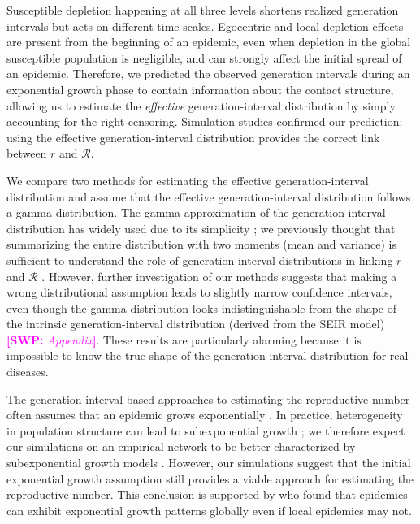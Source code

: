 \documentclass[12pt]{article}
\newcommand{\RR}{\ensuremath{{\mathcal R}}}
\newcommand{\comment}[3]{\textcolor{#1}{\textbf{[#2: }\textsl{#3}\textbf{]}}}
\newcommand{\swp}[1]{\comment{magenta}{SWP}{#1}}
\begin{document}
Susceptible depletion happening at all three levels shortens realized generation intervals but acts on different time scales.
Egocentric and local depletion effects are present from the beginning of an epidemic, even when depletion in the global susceptible population is negligible, and can strongly affect the initial spread of an epidemic.
Therefore, we predicted the observed generation intervals during an exponential growth phase to contain information about the contact structure, allowing us to estimate the \emph{effective} generation-interval distribution by simply accounting for the right-censoring.
Simulation studies confirmed our prediction: using the effective generation-interval distribution provides the correct link between $r$ and $\RR$.

We compare two methods for estimating the effective generation-interval distribution and assume that the effective generation-interval distribution follows a gamma distribution.
The gamma approximation of the generation interval distribution has widely used due to its simplicity \citep{mcbryde2009early, nishiura2009transmission, roberts2011early, trichereau2012estimation, nishiura2015theoretical};
we previously thought that summarizing the entire distribution with two moments (mean and variance) is sufficient to understand the role of generation-interval distributions in linking $r$ and $\RR$ \citep{park2019practical}.
However, further investigation of our methods suggests that making a wrong distributional assumption leads to slightly narrow confidence intervals, even though the gamma distribution looks indistinguishable from the shape of the intrinsic generation-interval distribution (derived from the SEIR model) \swp{Appendix}.
These results are particularly alarming because it is impossible to know the true shape of the generation-interval distribution for real diseases.

The generation-interval-based approaches to estimating the reproductive number often assumes that an epidemic grows exponentially \citep{wearing2005appropriate, wallinga2007generation, roberts2007model, park2019practical}.
In practice, heterogeneity in population structure can lead to subexponential growth \citep{szendroi2004polynomial, chowell2015western, chowell2016growing, chowell2016characterizing, kiskowski2016modeling, viboud2016generalized};
we therefore expect our simulations on an empirical network to be better characterized by subexponential growth models \citep{viboud2016generalized}.
However, our simulations suggest that the initial exponential growth assumption still provides a viable approach for estimating the reproductive number.
This conclusion is supported by \cite{chowell2015western} who found that epidemics can exhibit exponential growth patterns globally even if local epidemics may not.
\end{document}
